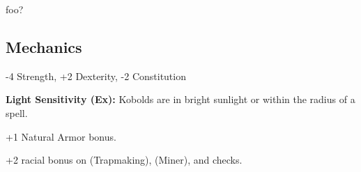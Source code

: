 
foo?

\subsection{Mechanics}

\begin{itemize*}
\item {}
\item {}
\item {}
\item {}
\item -4 Strength, +2 Dexterity, -2 Constitution
\item \textbf{Light Sensitivity (Ex):} Kobolds are  in bright sunlight or within the radius of a  spell.
\item +1 Natural Armor bonus.
\item +2 racial bonus on  (Trapmaking),  (Miner), and  checks.
\item {}
\item {}
\item {}
\end{itemize*}
